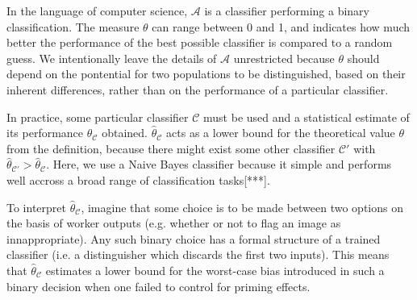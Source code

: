 \documentclass[a4paper]{report}
\begin{document}
In the language of computer science, $\mathcal{A}$ is a classifier performing
a binary classification.  The measure $\theta$ can range between 0 and 1, and 
indicates how much better the performance of the best possible classifier is 
compared to a random guess. We intentionally leave the details of 
$\mathcal{A}$ unrestricted because $\theta$ should depend on the pontential 
for two populations to be distinguished, based on their inherent differences, 
rather than on the performance of a particular classifier.

In practice, some particular classifier $\mathcal{C}$ must be used and a 
statistical estimate of its performance $\hat{\theta}_\mathcal{C}$ obtained. 
$\hat{\theta}_\mathcal{C}$ acts as a lower bound for the 
theoretical value $\theta$ from the definition, because there might 
exist some other classifier $\mathcal{C}'$ with 
$\hat{\theta}_\mathcal{C'}>\hat{\theta}_\mathcal{C}$.
Here, we use a Naive Bayes classifier because it simple and performs well 
accross a broad range of classification tasks[***].

To interpret $\hat{\theta}_\mathcal{C}$, imagine that some choice is to be
made between two options on the basis of worker outputs (e.g. whether or not 
to flag an image as innappropriate). Any such binary choice has a formal 
structure of a trained classifier (i.e. a distinguisher which discards the 
first two inputs). This means that $\hat{\theta}_\mathcal{C}$ estimates a 
lower bound for the worst-case bias introduced in such a binary decision when 
one failed to control for priming effects.
\end{document}
